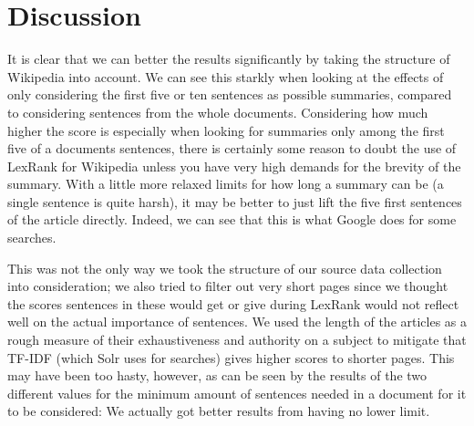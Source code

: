 
\chapter{Discussion}

It is clear that we can better the results significantly by taking the structure of Wikipedia into account. We can see this starkly when looking at the effects of only considering the first five or ten sentences as possible summaries, compared to considering sentences from the whole documents. Considering how much higher the score is especially when looking for summaries only among the first five of a documents sentences, there is certainly some reason to doubt the use of LexRank for Wikipedia unless you have very high demands for the brevity of the summary. With a little more relaxed limits for how long a summary can be (a single sentence is quite harsh), it may be better to just lift the five first sentences of the article directly. Indeed, we can see that this is what Google does for some searches.

This was not the only way we took the structure of our source data collection into consideration; we also tried to filter out very short pages since we thought the scores sentences in these would get or give during LexRank would not reflect well on the actual importance of sentences. We used the length of the articles as a rough measure of their exhaustiveness and authority on a subject to mitigate that TF-IDF (which Solr uses for searches) gives higher scores to shorter pages. This may have been too hasty, however, as can be seen by the results of the two different values for the minimum amount of sentences needed in a document for it to be considered: We actually got better results from having no lower limit.